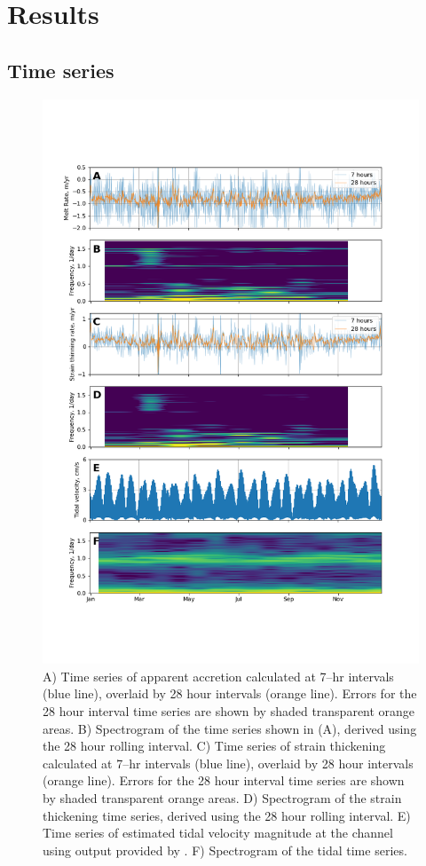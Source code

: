 \newpage
\section{Results } \label{sec:results}

\subsection{Time series}

\begin{figure}[!ht]
\centering
\includegraphics[width=0.7
\textwidth]{chapters/3/alltimeseries.png}
\caption[]{A) Time series of apparent accretion calculated at 7--hr intervals (blue line), overlaid by 28 hour intervals (orange line). Errors for the 28 hour interval time series are shown by shaded transparent orange areas. B) Spectrogram of the time series shown in (A), derived using the 28 hour rolling interval. C) Time series of strain thickening calculated at 7--hr intervals (blue line), overlaid by 28 hour intervals (orange line). Errors for the 28 hour interval time series are shown by shaded transparent orange areas. D)  Spectrogram of the strain thickening time series, derived using the 28 hour rolling interval. E) Time series of estimated tidal velocity magnitude at the channel using output provided by \cite{padman2002new}. F) Spectrogram of the tidal time series.
}
\label{fig:alltimeseries}
\end{figure}


